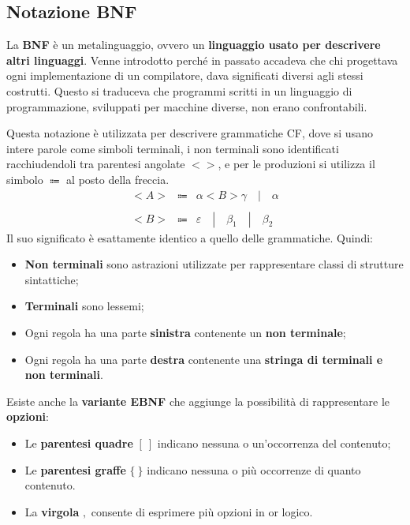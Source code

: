 \documentclass[a4paper]{article}
\begin{document}
	\subsection{Notazione BNF}

	La \textcolor{Red3}{\textbf{BNF}} è un metalinguaggio, ovvero un \textbf{linguaggio usato per descrivere altri linguaggi}. Venne introdotto perché in passato accadeva che chi progettava ogni implementazione di un compilatore, dava significati diversi agli stessi costrutti. Questo si traduceva che programmi scritti in un linguaggio di programmazione, sviluppati per macchine diverse, non erano confrontabili.\newline

	\noindent
	Questa notazione è utilizzata per descrivere grammatiche CF, dove si usano intere parole come simboli terminali, i non terminali sono identificati racchiudendoli tra parentesi angolate $<>$, e per le produzioni si utilizza il simbolo $\Coloneqq$ al posto della freccia.
	\begin{equation*}
		\begin{array}{lll}
			<A> & \Coloneqq & \alpha <B> \gamma \hspace{1em} | \hspace{1em} \alpha \\
			\\
			<B> & \Coloneqq & \varepsilon \hspace{1em} | \hspace{1em} \beta_{1} \hspace{1em} | \hspace{1em} \beta_{2}
		\end{array}
	\end{equation*}
	Il suo significato è esattamente identico a quello delle grammatiche. Quindi:
	\begin{itemize}
		\item \textbf{Non terminali} sono astrazioni utilizzate per rappresentare classi di strutture sintattiche;
		\item \textbf{Terminali} sono lessemi;
		\item Ogni regola ha una parte \textbf{sinistra} contenente un \textbf{non terminale};
		\item Ogni regola ha una parte \textbf{destra} contenente una \textbf{stringa di terminali e non terminali}.
	\end{itemize}
	Esiste anche la \textcolor{Red3}{\textbf{variante EBNF}} che aggiunge la possibilità di rappresentare le \textbf{opzioni}:
	\begin{itemize}
		\item Le \textbf{parentesi quadre} $[\:]$ indicano nessuna o un'occorrenza del contenuto;
		\item Le \textbf{parentesi graffe} $\{\:\}$ indicano nessuna o più occorrenze di quanto contenuto.
		\item La \textbf{virgola} $,$ consente di esprimere più opzioni in or logico.
	\end{itemize}
\end{document}
